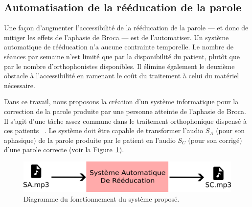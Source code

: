 \subsection{Automatisation de la rééducation de la parole}

Une façon d'augmenter l'accessibilité de la rééducation de la parole 
--- et donc de mitiger les effets de l'aphasie de Broca ---
est de l'automatiser.
Un système automatique de rééducation n'a aucune contrainte temporelle.
Le nombre de séances par semaine n'est limité que par la disponibilité du patient,
plutôt que par le nombre d'orthophonistes disponibles.
Il élimine également le deuxième obstacle à l'accessibilité
en ramenant le coût du traitement à celui du matériel nécessaire.

Dans ce travail, nous proposons la création d'un système informatique 
pour la correction de la parole produite par une personne atteinte de l'aphasie de Broca.
Il s'agit d'une tâche assez commune dans le traitement orthophonique dispensé à ces patients%
~\cite{recover,Acharya_Wroten_2022}.
Le système doit être capable de transformer l'audio \(S_A\) (pour son aphasique) de la parole produite par le patient
en l'audio \(S_C\) (pour son corrigé) d'une parole correcte (voir la Figure~\ref{fig.global-system}).

\begin{figure}[hbt]
    \centering
    \includegraphics[width=.8\textwidth]{assets/images/system.png}
    \caption{Diagramme du fonctionnement du système proposé.}
    \label{fig.global-system}
\end{figure}
